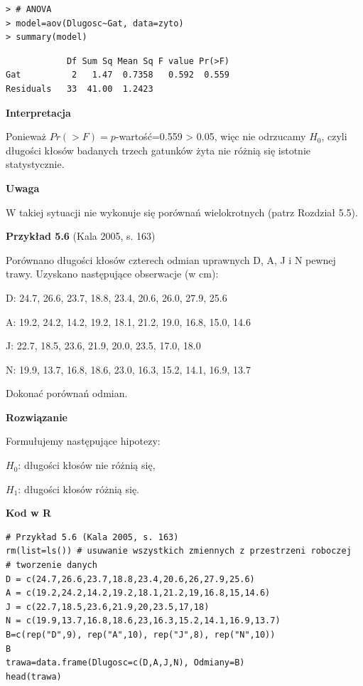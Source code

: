 \documentclass[12pt,B5paper,]{book}
\begin{document}
\begin{verbatim}
> # ANOVA
> model=aov(Dlugosc~Gat, data=zyto)
> summary(model)
\end{verbatim}

\begin{verbatim}
            Df Sum Sq Mean Sq F value Pr(>F)
Gat          2   1.47  0.7358   0.592  0.559
Residuals   33  41.00  1.2423               
\end{verbatim}

\vspace{0.8cm}

\textbf{Interpretacja}

Ponieważ \(Pr(>F)=p\)-wartość=0.559 \textgreater{} 0.05, więc nie
odrzucamy \(H_0\), czyli długości kłosów badanych trzech gatunków żyta
nie różnią się istotnie statystycznie.

\vspace{0.8cm}

\textbf{Uwaga}

W takiej sytuacji nie wykonuje się porównań wielokrotnych (patrz
Rozdział 5.5).

\newpage

\textbf{Przykład 5.6} (Kala 2005, s. 163)

Porównano długości kłosów czterech odmian uprawnych D, A, J i N pewnej
trawy. Uzyskano następujące obserwacje (w cm):

D: 24.7, 26.6, 23.7, 18.8, 23.4, 20.6, 26.0, 27.9, 25.6

A: 19.2, 24.2, 14.2, 19.2, 18.1, 21.2, 19.0, 16.8, 15.0, 14.6

J: 22.7, 18.5, 23.6, 21.9, 20.0, 23.5, 17.0, 18.0

N: 19.9, 13.7, 16.8, 18.6, 23.0, 16.3, 15.2, 14.1, 16.9, 13.7

Dokonać porównań odmian.

\vspace{0.8cm}

\textbf{Rozwiązanie}

Formułujemy następujące hipotezy:

\hspace*{5cm} \(H_0\): długości kłosów nie różnią się,

\hspace*{5cm} \(H_1\): długości kłosów różnią się.

\textbf{Kod w R}

\begin{verbatim}
# Przykład 5.6 (Kala 2005, s. 163)
rm(list=ls()) # usuwanie wszystkich zmiennych z przestrzeni roboczej
# tworzenie danych
D = c(24.7,26.6,23.7,18.8,23.4,20.6,26,27.9,25.6)
A = c(19.2,24.2,14.2,19.2,18.1,21.2,19,16.8,15,14.6)
J = c(22.7,18.5,23.6,21.9,20,23.5,17,18)
N = c(19.9,13.7,16.8,18.6,23,16.3,15.2,14.1,16.9,13.7)
B=c(rep("D",9), rep("A",10), rep("J",8), rep("N",10))
B
trawa=data.frame(Dlugosc=c(D,A,J,N), Odmiany=B)
head(trawa)
\end{verbatim}
\end{document}
